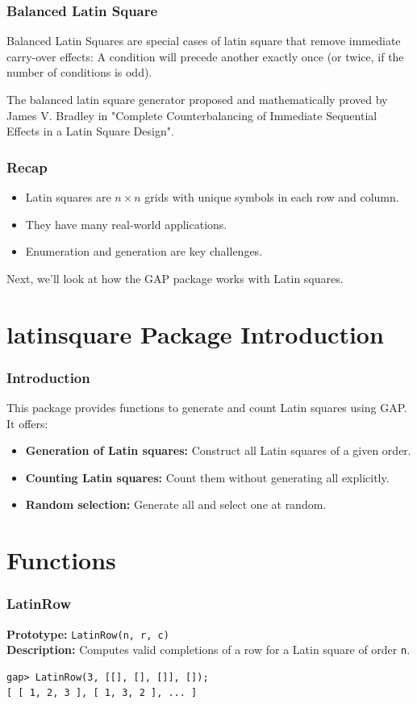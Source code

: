 \documentclass{beamer}
\begin{document}
\begin{frame}
\frametitle{Balanced Latin Square}
Balanced Latin Squares are special cases of latin square that remove immediate carry-over effects: A condition will precede another exactly once (or twice, if the number of conditions is odd).

The balanced latin square generator proposed and mathematically proved by James V. Bradley in "Complete Counterbalancing of Immediate Sequential Effects in a Latin Square Design".
\end{frame}

\begin{frame}
\frametitle{Recap}
\begin{itemize}
  \item Latin squares are $n \times n$ grids with unique symbols in each row and column.
  \item They have many real-world applications.
  \item Enumeration and generation are key challenges.
\end{itemize}
Next, we'll look at how the GAP package works with Latin squares.
\end{frame}

\section{latinsquare Package Introduction}
\begin{frame}
\frametitle{Introduction}
This package provides functions to generate and count Latin squares using GAP. It offers:
\begin{itemize}
  \item \textbf{Generation of Latin squares:} Construct all Latin squares of a given order.
  \item \textbf{Counting Latin squares:} Count them without generating all explicitly.
  \item \textbf{Random selection:} Generate all and select one at random.
\end{itemize}
\end{frame}

\section{Functions}
\begin{frame}[fragile]
\frametitle{LatinRow}
\textbf{Prototype:} \texttt{LatinRow(n, r, c)}\\
\textbf{Description:} Computes valid completions of a row for a Latin square of order \texttt{n}.
\begin{lstlisting}
gap> LatinRow(3, [[], [], []], []);
[ [ 1, 2, 3 ], [ 1, 3, 2 ], ... ]
\end{lstlisting}
\end{frame}
\end{document}
